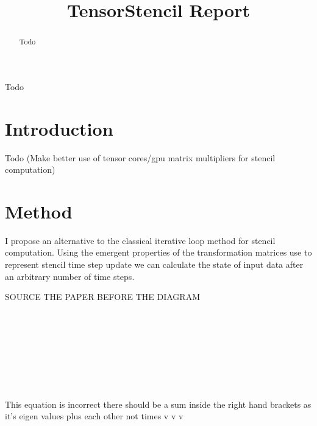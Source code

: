 \documentclass[conference]{IEEEtran}
\begin{document}

\title{TensorStencil Report}

\author{

}

\maketitle

\begin{abstract}
Todo
\end{abstract}

\begin{IEEEkeywords}
Todo
\end{IEEEkeywords}


\section{Introduction}
Todo (Make better use of tensor cores/gpu matrix multipliers for stencil computation)
\section{Method}
I propose an alternative to the classical iterative loop method for stencil computation. 
Using the emergent properties of the transformation matrices use to represent stencil time step update we can calculate the state of input data after an arbitrary number of time steps. 

SOURCE THE PAPER BEFORE THE DIAGRAM \\

 \\
 \\
 \\
 \\
 \\







 \\ \\ \\ 
This equation is incorrect there should be a sum inside the right hand brackets as it's eigen values plus each other not times v v v\\
 \\
\end{document}

